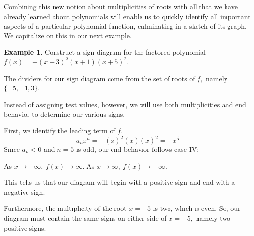 \documentclass[12pt]{book}
\theoremstyle{definition}
\newtheorem{example}{Example}
\begin{document}
Combining this new notion about multiplicities of roots with all that we have already learned about polynomials will enable us to quickly identify all important aspects of a particular polynomial function, culminating in a sketch of its graph.  We capitalize on this in our next example.
\begin{example}
Construct a sign diagram for the factored polynomial\\ $f(x)=-(x-3)^2(x+1)(x+5)^2$.
\par
The dividers for our sign diagram come from the set of roots of $f,$ namely $\{-5,-1,3\}$.  
\begin{center}
\end{center}
Instead of assigning test values, however, we will use both multiplicities and end behavior to determine our various signs.
\par
First, we identify the leading term of $f$.
$$a_nx^n=-(x)^2(x)(x)^2=-x^5$$
Since $a_n<0$ and $n=5$ is odd, our end behavior follows case IV:
\begin{center}
As $x\rightarrow -\infty, \ f(x)\rightarrow\infty.$ \hspace{1in} As $x\rightarrow\infty, \ f(x)\rightarrow -\infty.$
\end{center}
This tells us that our diagram will begin with a positive sign and end with a negative sign.
\begin{center}
\end{center}
Furthermore, the multiplicity of the root $x=-5$ is two, which is even.  So, our diagram must contain the same signs on either side of $x=-5,$ namely two positive signs.
\begin{center}

\end{center}
\end{example}
\end{document}
